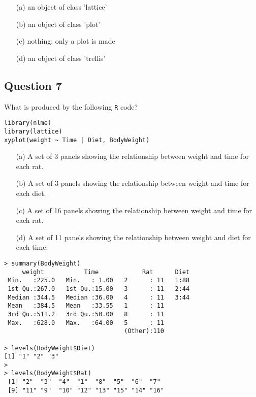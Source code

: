 \documentclass[12pt]{article}
\begin{document}
\begin{itemize}
\item[(a)] an object of class 'lattice'
\item[(b)] an object of class 'plot'
\item[(c)] nothing; only a plot is made
\item[(d)] an object of class 'trellis'
\end{itemize}




\newpage
\subsection*{Question 7}
What is produced by the following \texttt{R} code?
\begin{framed}
\begin{verbatim}
library(nlme)
library(lattice)
xyplot(weight ~ Time | Diet, BodyWeight)
\end{verbatim}
\end{framed}

\begin{itemize}
\item[(a)] A set of 3 panels showing the relationship between weight and time for each rat.
\item[(b)] A set of 3 panels showing the relationship between weight and time for each diet.
\item[(c)] A set of 16 panels showing the relationship between weight and time for each rat.
\item[(d)] A set of 11 panels showing the relationship between weight and diet for each time.
\end{itemize}



\begin{verbatim}
> summary(BodyWeight)
     weight           Time            Rat      Diet  
 Min.   :225.0   Min.   : 1.00   2      : 11   1:88  
 1st Qu.:267.0   1st Qu.:15.00   3      : 11   2:44  
 Median :344.5   Median :36.00   4      : 11   3:44  
 Mean   :384.5   Mean   :33.55   1      : 11         
 3rd Qu.:511.2   3rd Qu.:50.00   8      : 11         
 Max.   :628.0   Max.   :64.00   5      : 11         
                                 (Other):110      

> levels(BodyWeight$Diet)
[1] "1" "2" "3"
>
> levels(BodyWeight$Rat)
 [1] "2"  "3"  "4"  "1"  "8"  "5"  "6"  "7" 
 [9] "11" "9"  "10" "12" "13" "15" "14" "16"

\end{verbatim}
\end{document}
